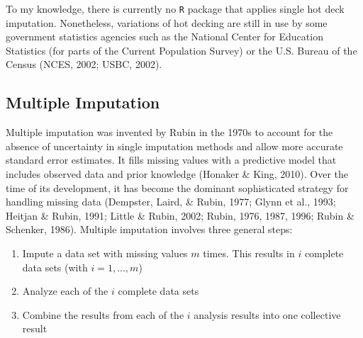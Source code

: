 \documentclass[12pt,econ]{sources/authesis}
\begin{document}
To my knowledge, there is currently no \texttt{R} package that applies single hot deck imputation. Nonetheless, variations of hot decking are still in use by some government statistics agencies such as the National Center for Education Statistics (for parts of the Current Population Survey) or the U.S. Bureau of the Census (NCES, 2002; USBC, 2002).

\hypertarget{ordmiss-theory-multimpute}{%
\subsection{Multiple Imputation}\label{ordmiss-theory-multimpute}}

Multiple imputation was invented by Rubin in the 1970s to account for the absence of uncertainty in single imputation methods and allow more accurate standard error estimates. It fills missing values with a predictive model that includes observed data and prior knowledge (Honaker \& King, 2010). Over the time of its development, it has become the dominant sophisticated strategy for handling missing data (Dempster, Laird, \& Rubin, 1977; Glynn et al., 1993; Heitjan \& Rubin, 1991; Little \& Rubin, 2002; Rubin, 1976, 1987, 1996; Rubin \& Schenker, 1986). Multiple imputation involves three general steps:
\begin{enumerate}
\def\labelenumi{(\arabic{enumi})}
\item
  Impute a data set with missing values \(m\) times. This results in \(i\) complete data sets (with \(i = 1, ..., m\))
\item
  Analyze each of the \(i\) complete data sets
\item
  Combine the results from each of the \(i\) analysis results into one collective result
\end{enumerate}
\ssp
\end{document}

